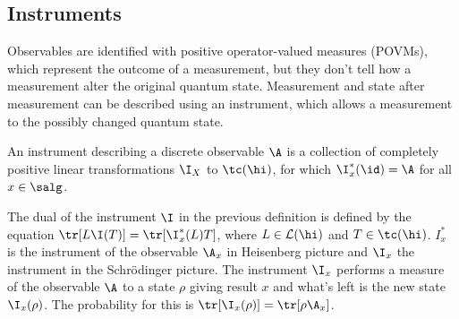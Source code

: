 


\subsection{Instruments}
Observables are identified with positive operator-valued measures (POVMs), which represent the outcome of a measurement, but they don't tell how a measurement alter the original quantum state. Measurement and state after measurement can be described using an instrument, which allows a measurement to the possibly changed quantum state.

\begin{definition}
An instrument describing a discrete observable $\A$ is a collection of completely positive linear transformations $\I_X$ to $\tc (\hi )$, for which $\I_x^* (\id ) = \A$ for all $x \in \salg$.
\end{definition}
The dual of the instrument $\I$ in the previous definition is defined by the equation $\tr[L \I (T)] = \tr[\I_x^* (L)T]$, where $L \in \mathcal{L}(\hi)$ and $T \in \tc (\hi)$. $I_x^*$ is the instrument of the observable $\A_x$ in Heisenberg picture and $\I_x$ the instrument in the Schrödinger picture. The instrument $\I_x$ performs a measure of the observable $\A$ to a state $\rho$ giving result $x$ and what's left is the new state $\I_x(\rho)$. The probability for this is $\tr[\I_x(\rho)] = \tr[\rho \A_x]$.

